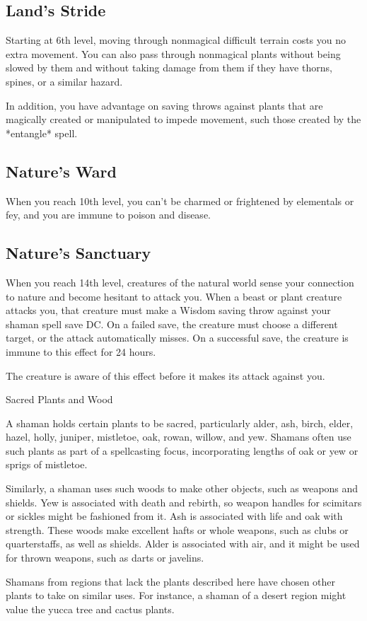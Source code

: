 \subsection{Land's Stride}

Starting at 6th level, moving through nonmagical difficult terrain costs you no extra movement. You can also pass through nonmagical plants without being slowed by them and without taking damage from them if they have thorns, spines, or a similar hazard.

In addition, you have advantage on saving throws against plants that are magically created or manipulated to impede movement, such those created by the *entangle* spell.

\subsection{Nature's Ward}

When you reach 10th level, you can't be charmed or frightened by elementals or fey, and you are immune to poison and disease.

\subsection{Nature's Sanctuary}

When you reach 14th level, creatures of the natural world sense your connection to nature and become hesitant to attack you. When a beast or plant creature attacks you, that creature must make a Wisdom saving throw against your shaman spell save DC. On a failed save, the creature must choose a different target, or the attack automatically misses. On a successful save, the creature is immune to this effect for 24 hours.

The creature is aware of this effect before it makes its attack against you.

\begin{DndComment}{Sacred Plants and Wood}

A shaman holds certain plants to be sacred, particularly alder, ash, birch, elder, hazel, holly, juniper, mistletoe, oak, rowan, willow, and yew. Shamans often use such plants as part of a spellcasting focus, incorporating lengths of oak or yew or sprigs of mistletoe.

 Similarly, a shaman uses such woods to make other objects, such as weapons and shields. Yew is associated with death and rebirth, so weapon handles for scimitars or sickles might be fashioned from it. Ash is associated with life and oak with strength. These woods make excellent hafts or whole weapons, such as clubs or quarterstaffs, as well as shields. Alder is associated with air, and it might be used for thrown weapons, such as darts or javelins.

 Shamans from regions that lack the plants described here have chosen other plants to take on similar uses. For instance, a shaman of a desert region might value the yucca tree and cactus plants.
\end{DndComment}

